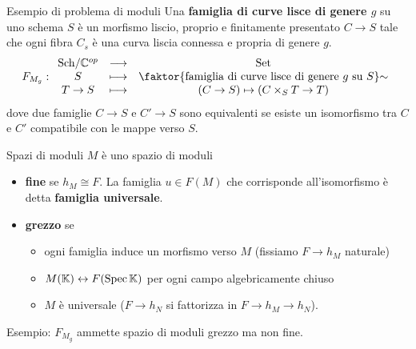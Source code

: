 \documentclass[a4paper]{beamer}
\begin{document}
\begin{frame}{Esempio di problema di moduli}
Una \textbf{famiglia di curve lisce di genere $g$} su uno schema $S$ \`e un morfismo liscio, proprio e finitamente presentato $C\to S$ tale che ogni fibra $C_s$ \`e una curva liscia connessa e propria di genere $g$.
\[F_{M_g}:\functorDef{\Sch\C\op}{\Set}{S}{\quot{\cpa{\text{famiglia di curve lisce di genere $g$ su $S$}}}\sim}{T\to S}{(C\to S)\mapsto (C\times_S T\to T)}\]
dove due famiglie $C\to S$ e $C'\to S$ sono equivalenti se esiste un isomorfismo tra $C$ e $C'$ compatibile con le mappe verso $S$.
\begin{center}
\end{center}
\end{frame}

\begin{frame}{Spazi di moduli}
$M$ \`e uno spazio di moduli\pause
\begin{itemize}
\item \textbf{fine} se $h_M\cong F$. La famiglia $u\in F(M)$ che corrisponde all'isomorfismo \`e detta \textbf{famiglia universale}.\pause
\item \textbf{grezzo} se 
\begin{itemize}
\item ogni famiglia induce un morfismo verso $M$ (fissiamo $F\to h_M$ naturale)
\item $M(\mathbb{K})\leftrightarrow F(\mathrm{Spec}\,\mathbb{K})$ per ogni campo algebricamente chiuso
\item $M$ \`e universale ($F\to h_N$ si fattorizza in $F\to h_M\to h_N$).
\end{itemize}
\end{itemize}
\medskip\pause

Esempio: $F_{M_g}$ ammette spazio di moduli grezzo ma non fine.
\end{frame}
\end{document}
